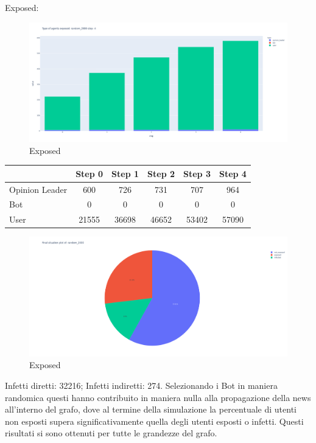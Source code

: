         Exposed:
        \begin{figure}[H]
            \includegraphics[width=16cm]{resources/charts/random_2000_bar.png}
            \caption{Exposed}
            \label{fig:random_2000_bar}
        \end{figure}
        
        \begin{table}[H]
            \centering
            \begin{tabular}{|l|c|c|c|c|c|}
            \hline
                           & Step 0 & Step 1 & Step 2 & Step 3 & Step 4 \\ \hline
            Opinion Leader & 600    & 726    & 731    & 707    & 964    \\ \hline
            Bot            & 0      & 0      & 0      & 0      & 0      \\ \hline
            User           & 21555  & 36698  & 46652  & 53402  & 57090  \\ \hline
            \end{tabular}
        \end{table}
        
               
        \begin{figure}[H]
            \includegraphics[width=16cm]{resources/charts/random_2000_pie.png}
            \caption{Exposed}
            \label{fig:random_2000_pie}
        \end{figure}
        Infetti diretti: 32216; \newline
        Infetti indiretti: 274.
        \newline \newline
        Selezionando i Bot in maniera randomica questi hanno contribuito in maniera nulla alla propagazione della news all’interno del grafo, dove al termine della simulazione la percentuale di utenti non esposti supera significativamente quella degli utenti esposti o infetti.
        Questi risultati si sono ottenuti per tutte le grandezze del grafo.



